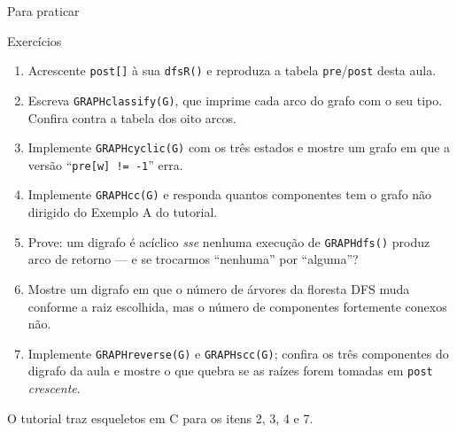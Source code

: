 \documentclass[aspectratio=169]{beamer}
\begin{document}
\begin{frame}{Para praticar}
  \begin{block}{Exercícios}
    {\scriptsize
    \begin{enumerate}\scriptsize\setlength{\itemsep}{0pt}
      \item Acrescente \texttt{post[]} à sua \texttt{dfsR()} e reproduza a tabela
            \texttt{pre}/\texttt{post} desta aula.
      \item Escreva \texttt{GRAPHclassify(G)}, que imprime cada arco do grafo com
            o seu tipo. Confira contra a tabela dos oito arcos.
      \item Implemente \texttt{GRAPHcyclic(G)} com os três estados e mostre um
            grafo em que a versão ``\texttt{pre[w] != -1}'' erra.
      \item Implemente \texttt{GRAPHcc(G)} e responda quantos componentes tem o
            grafo não dirigido do Exemplo A do tutorial.
      \item Prove: um digrafo é acíclico \emph{sse} nenhuma execução de
            \texttt{GRAPHdfs()} produz arco de retorno --- e se trocarmos
            ``nenhuma'' por ``alguma''?
      \item Mostre um digrafo em que o número de árvores da floresta DFS muda
            conforme a raiz escolhida, mas o número de componentes fortemente
            conexos não.
      \item Implemente \texttt{GRAPHreverse(G)} e \texttt{GRAPHscc(G)}; confira
            os três componentes do digrafo da aula e mostre o que quebra se as
            raízes forem tomadas em \texttt{post} \emph{crescente}.
    \end{enumerate}}
  \end{block}
  \vspace{-8pt}
  {\scriptsize O tutorial traz esqueletos em C para os itens 2, 3, 4 e 7.}
\end{frame}
\end{document}
